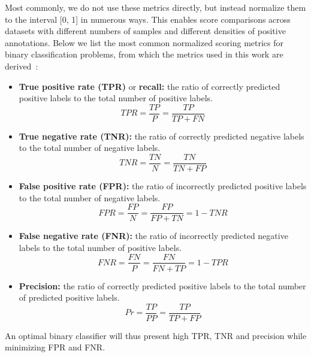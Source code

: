 Most commonly, we do not use these metrics directly, but instead normalize them to the interval [0, 1] in numerous ways. This enables score comparisons across datasets with different numbers of samples and different densities of positive annotations. Below we list the most common normalized scoring metrics for binary classification problems, from which the metrics used in this work are derived~\cite{powers2020evaluation}:
%
\begin{itemize}
    \item \textbf{True positive rate (TPR)} or \textbf{recall:} the ratio of correctly predicted positive labels to the total number of positive labels.
    \begin{equation}
        TPR = \frac{TP}{P} = \frac{TP}{TP + FN}
        \label{eq:tpr}
    \end{equation}
    \item \textbf{True negative rate (TNR):} the ratio of correctly predicted negative labels to the total number of negative labels.
    \begin{equation}
        TNR = \frac{TN}{N} = \frac{TN}{TN + FP}
        \label{eq:tnr}
    \end{equation}
    \item \textbf{False positive rate (FPR):} the ratio of incorrectly predicted positive labels to the total number of negative labels.
    \begin{equation}
        FPR = \frac{FP}{N} = \frac{FP}{FP + TN} = 1-TNR 
        \label{eq:fpr}
    \end{equation}
    \item \textbf{False negative rate (FNR):} the ratio of incorrectly predicted negative labels to the total number of positive labels.
    \begin{equation}
        FNR = \frac{FN}{P} = \frac{FN}{FN + TP} = 1-TPR
        \label{eq:fnr}
    \end{equation}
    \item \textbf{Precision:} the ratio of correctly predicted positive labels to the total number of predicted positive labels.
    \begin{equation}
        Pr = \frac{TP}{PP} = \frac{TP}{TP + FP}
        \label{eq:precision}
    \end{equation}
\end{itemize}
%

An optimal binary classifier will thus present high TPR, TNR and precision while minimizing FPR and FNR.

